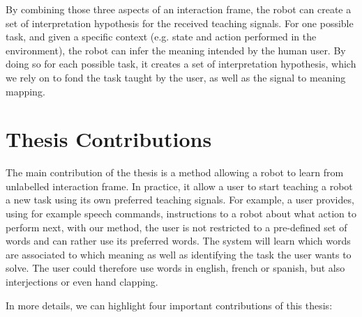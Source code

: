 By combining those three aspects of an interaction frame, the robot can create a set of interpretation hypothesis for the received teaching signals. For one possible task, and given a specific context (e.g. state and action performed in the environment), the robot can infer the meaning intended by the human user. By doing so for each possible task, it creates a set of interpretation hypothesis, which we rely on to fond the task taught by the user, as well as the signal to meaning mapping.


\section{Thesis Contributions}

The main contribution of the thesis is a method allowing a robot to learn from unlabelled interaction frame. In practice, it allow a user to start teaching a robot a new task using its own preferred teaching signals. For example, a user provides, using for example speech commands, instructions to a robot about what action to perform next, with our method, the user is not restricted to a pre-defined set of words and can rather use its preferred words. The system will learn which words are associated to which meaning as well as identifying the task the user wants to solve. The user could therefore use words in english, french or spanish, but also interjections or even hand clapping.

In more details, we can highlight four important contributions of this thesis:

